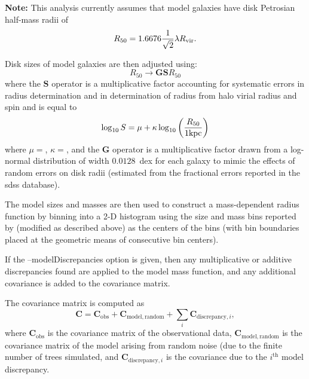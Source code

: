 {\normalfont \bfseries Note:} This analysis currently assumes that model galaxies have disk Petrosian half-mass radii of
\begin{equation}
 R_\mathrm{50} = 1.6676 {1 \over \sqrt{2}} \lambda R_\mathrm{vir}.
\end{equation}

Disk sizes of model galaxies are then adjusted using:
\begin{equation}
 R_{50} \rightarrow \mathbf{G} \mathbf{S} R_{50} 
\end{equation}
where the $\mathbf{S}$ operator is a multiplicative factor accounting for systematic errors in radius determination and in determination of radius from halo virial radius and spin and is equal to
\begin{equation}
 \log_\mathrm{10} S = \mu + \kappa \log_\mathrm{10} \left({R_{50} \over 1 \hbox{kpc}}\right)
\end{equation}
where $\mu=${\normalfont {}}, $\kappa=${\normalfont {}}, and the {\normalfont \bfseries G} operator is a multiplicative factor drawn from a log-normal distribution of width $0.0128$~dex for each galaxy to mimic the effects of random errors on disk radii (estimated from the fractional errors reported in the \gls{sdss} database).

The model sizes and masses are then used to construct a mass-dependent radius function by binning into a 2-D histogram using the size and mass bins reported by \cite{shen_size_2003} (modified as described above) as the centers of the bins (with bin boundaries placed at the geometric means of consecutive bin centers).

If the {\normalfont \ttfamily --modelDiscrepancies} option is given, then any multiplicative or additive discrepancies found are applied to the model mass function, and any additional covariance is added to the covariance matrix.

The covariance matrix is computed as
\begin{equation}
 \mathbf{C} = \mathbf{C}_\mathrm{obs} + \mathbf{C}_\mathrm{model,random} + \sum_i \mathbf{C}_{\mathrm{discrepancy}, i},
\end{equation}
where $\mathbf{C}_\mathrm{obs}$ is the covariance matrix of the observational data, $\mathbf{C}_\mathrm{model,random}$ is the covariance matrix of the model arising from random noise (due to the finite number of trees simulated, and $\mathbf{C}_{\mathrm{discrepancy}, i}$ is the covariance due to the $i^\mathrm{th}$ model discrepancy.

